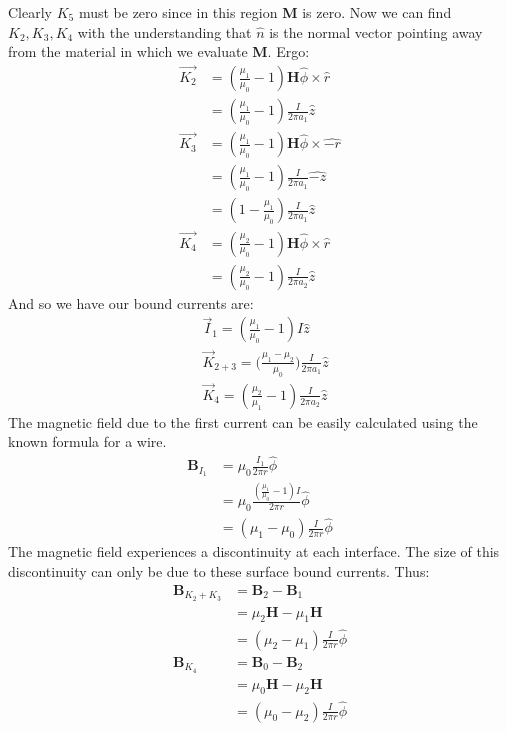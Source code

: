 \documentclass[a4paper, 11pt]{article}
\begin{document}
\noindent Clearly $K_5$ must be zero since in this region \textbf{M} is zero. Now we can find $K_2, K_3, K_4$ with the understanding that $\hat{n}$ is the normal vector pointing away from the material in which we evaluate \textbf{M}. Ergo: 
	\begin{align*}
		\vec{K_2} 	&= (\frac{\mu_1}{\mu_0}-1)\mathbf{H}\hat{\phi} \times \hat{r} \\ 
					&= (\frac{\mu_1}{\mu_0}-1)\frac{I}{2\pi a_1}\hat{z} \\ 
		\vec{K_3}	&= (\frac{\mu_1}{\mu_0}-1)\mathbf{H}\hat{\phi} \times \hat{-r} \\ 
					&= (\frac{\mu_1}{\mu_0}-1)\frac{I}{2\pi a_1}\hat{-z} \\ 
					&= (1-\frac{\mu_1}{\mu_0})\frac{I}{2\pi a_1}\hat{z} \\
		\vec{K_4}	&= (\frac{\mu_2}{\mu_0}-1)\mathbf{H}\hat{\phi} \times \hat{r} \\ 
					&= (\frac{\mu_2}{\mu_0}-1)\frac{I}{2\pi a_2}\hat{z}
	\end{align*}
And so we have our bound currents are: 
	\begin{align*}
		&\vec{I}_1 = (\frac{\mu_1}{\mu_0}-1)I\hat{z} \\ 
		&\vec{K}_{2+3} = \Big(\frac{\mu_1-\mu_2}{\mu_0}\Big)\frac{I}{2\pi a_1}\hat{z} \\ 
		&\vec{K}_4 = (\frac{\mu_2}{\mu_1}-1)\frac{I}{2\pi a_2}\hat{z}   
	\end{align*}
The magnetic field due to the first current can be easily calculated using the known formula for a wire. 
	\begin{align*}
		\mathbf{B}_{I_1} &= \mu_0\frac{I_1}{2\pi r}\hat{\phi} \\ 
						&= \mu_0\frac{(\frac{\mu_1}{\mu_0}-1)I}{2\pi r}\hat{\phi} \\ 
						&= (\mu_1-\mu_0)\frac{I}{2\pi r}\hat{\phi}
	\end{align*}
The magnetic field experiences a discontinuity at each interface. The size of this discontinuity can only be due to these surface bound currents. Thus: 
	\begin{align*}
		\mathbf{B}_{K_2+K_3}	&= \mathbf{B}_2 - \mathbf{B}_1 \\ 
							&= \mu_2\mathbf{H} - \mu_1\mathbf{H} \\ 
							&= (\mu_2-\mu_1)\frac{I}{2\pi r}\hat{\phi} \\
		\mathbf{B}_{K_4} 	&= \mathbf{B}_0 - \mathbf{B}_2 \\ 
							&= \mu_0\mathbf{H} - \mu_2\mathbf{H} \\ 
							&= (\mu_0-\mu_2)\frac{I}{2\pi r}\hat{\phi}  
	\end{align*} 
	
	
	
	
	
	
	
	
	
	
	
	
	
	
\end{document}
